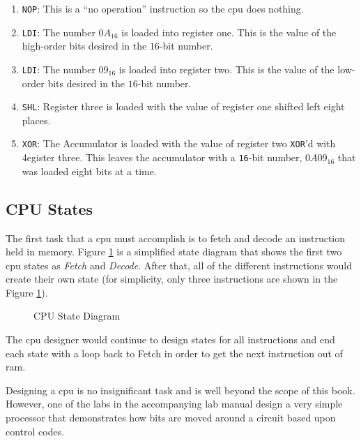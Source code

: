 \begin{enumerate}
  \item \lstinline[columns=fixed]|NOP|: This is a ``no operation'' instruction so the \gls{cpu} does nothing.
  \item \lstinline[columns=fixed]|LDI|: The number $ 0A_{16} $ is loaded into register one. This is the value of the high-order bits desired in the $ 16 $-bit number.
  \item \lstinline[columns=fixed]|LDI|: The number $ 09_{16} $ is loaded into register two.  This is the value of the low-order bits desired in the $ 16 $-bit number.
  \item \lstinline[columns=fixed]|SHL|: Register three is loaded with the value of register one shifted left eight places.
  \item \lstinline[columns=fixed]|XOR|: The Accumulator is loaded with the value of register two \lstinline[columns=fixed]|XOR|'d with 4egister three. This leaves the accumulator with a \lstinline[columns=fixed]|16|-bit number, $ 0A09_{16} $ that was loaded eight bits at a time.
\end{enumerate}

\subsection{CPU States}
\label{SIM:subsec:cpu_states}

The first task that a \gls{cpu} must accomplish is to fetch and decode an instruction held in memory. Figure \ref{SIM:fig:cpu_state_diagram} is a simplified state diagram that shows the first two \gls{cpu} states as \emph{Fetch} and \emph{Decode}. After that, all of the different instructions would create their own state (for simplicity, only three instructions are shown in the Figure \ref{SIM:fig:cpu_state_diagram}).

\begin{figure}[H]
  \caption{CPU State Diagram}
  \label{SIM:fig:cpu_state_diagram}
  \myfloatalign
\end{figure}

The \gls{cpu} designer would continue to design states for all instructions and end each state with a loop back to Fetch in order to get the next instruction out of \gls{ram}.

Designing a \gls{cpu} is no insignificant task and is well beyond the scope of this book. However, one of the labs in the accompanying lab manual design a very simple processor that demonstrates how bits are moved around a circuit based upon control codes.